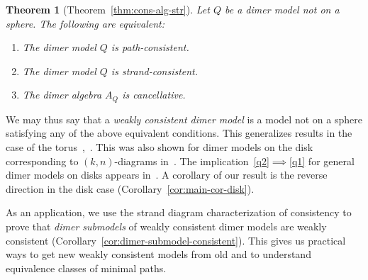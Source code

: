 \documentclass{article}
\newtheorem{thmIntro}{Theorem}    \renewcommand{\thethmIntro}{\Alph{thmIntro}}
\theoremstyle{definition}
\begin{document}
\begin{thmIntro}[Theorem~\ref{thm:cons-alg-str}]\label{thm:main1}
	Let $Q$ be a dimer model not on a sphere. The following are equivalent:
\begin{enumerate}
	\item\label{q1} The dimer model $Q$ is path-consistent.
	\item\label{q2} The dimer model $Q$ is strand-consistent.
	\item The dimer algebra $A_Q$ is cancellative.
\end{enumerate}
\end{thmIntro}

We may thus say that a \textit{weakly consistent dimer model} is a model not on a sphere satisfying any of the above equivalent conditions. This generalizes results in the case of the torus~\cite[Theorem 10.1]{XBocklandt2011},~\cite{XIU}.
This was also shown for dimer models on the disk corresponding to $(k,n)$-diagrams in~\cite{BKMX}. The implication~\eqref{q2}$\implies$\eqref{q1} for general dimer models on disks appears in~\cite[Proposition 2.11]{XPressland2019}. 
A corollary of our result is the reverse direction in the disk case (Corollary~\ref{cor:main-cor-disk}).

As an application, we use the strand diagram characterization of consistency to prove that \textit{dimer submodels} of weakly consistent dimer models are weakly consistent (Corollary~\ref{cor:dimer-submodel-consistent}). 
This gives us practical ways to get new weakly consistent models from old and to understand equivalence classes of minimal paths. 
\end{document}
